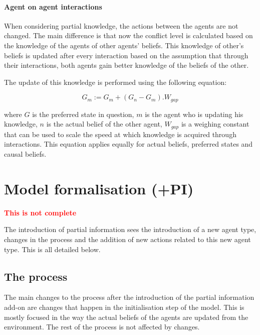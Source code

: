 \documentclass[11pt]{article}
\begin{document}
\paragraph{Agent on agent interactions}

When considering partial knowledge, the actions between the agents are not changed. The main difference is that now the conflict level is calculated based on the knowledge of the agents of other agents' beliefs. This knowledge of other's beliefs is updated after every interaction based on the assumption that through their interactions, both agents gain better knowledge of the beliefs of the other.

The update of this knowledge is performed using the following equation:

\begin{equation}
G_{m} := G_{m} + (G_{n} - G_{m}). W_{gap}
\end{equation}

where $G$ is the preferred state in question, $m$ is the agent who is updating his knowledge, $n$ is the actual belief of the other agent, $W_{gap}$ is a weighing constant that can be used to scale the speed at which knowledge is acquired through interactions. This equation applies equally for actual beliefs, preferred states and causal beliefs.



\section{Model formalisation (+PI)}

{\bfseries \textcolor{red}{This is not complete}}

The introduction of partial information sees the introduction of a new agent type, changes in the process and the addition of new actions related to this new agent type. This is all detailed below.

\subsection{The process}

The main changes to the process after the introduction of the partial information add-on are changes that happen in the initialisation step of the model. This is mostly focused in the way the actual beliefs of the agents are updated from the environment. The rest of the process is not affected by changes.
\end{document}
